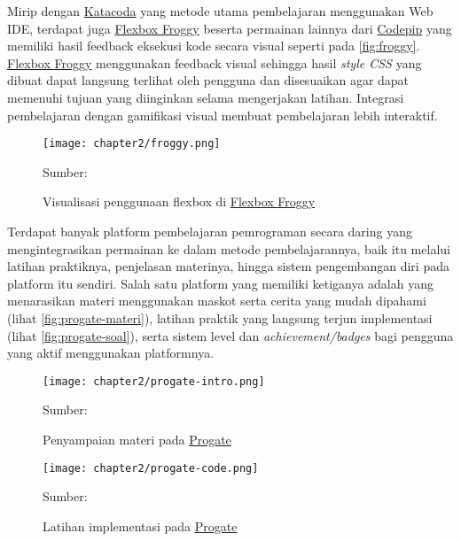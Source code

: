 Mirip dengan \href{https://www.katacoda.com/}{Katacoda} yang metode utama pembelajaran menggunakan Web IDE, terdapat juga \href{https://flexboxfroggy.com/}{Flexbox Froggy} \parencite{froggy2021media} beserta permainan lainnya dari \href{https://codepip.com/games/}{Codepip} yang memiliki hasil feedback eksekusi kode secara visual seperti pada \autoref{fig:froggy}. \href{https://flexboxfroggy.com/}{Flexbox Froggy} menggunakan feedback visual sehingga hasil \textit{style CSS} yang dibuat dapat langsung terlihat oleh pengguna dan disesuaikan agar dapat memenuhi tujuan yang diinginkan selama mengerjakan latihan. Integrasi pembelajaran dengan gamifikasi visual membuat pembelajaran lebih interaktif.

\begin{figure}[!h]
  \centering
  \texttt{[image: chapter2/froggy.png]}
  \caption{Visualisasi penggunaan flexbox di \href{https://www.flexboxfroggy.com/}{Flexbox Froggy}} \label{fig:froggy}
  Sumber: \textcite{froggy2021media}
\end{figure}

Terdapat banyak platform pembelajaran pemrograman secara daring yang mengintegrasikan permainan ke dalam metode pembelajarannya, baik itu melalui latihan praktiknya, penjelasan materinya, hingga sistem pengembangan diri pada platform itu sendiri. Salah satu platform yang memiliki ketiganya adalah \textcite{progate2021media} yang menarasikan materi menggunakan maskot serta cerita yang mudah dipahami (lihat \autoref{fig:progate-materi}), latihan praktik yang langsung terjun implementasi (lihat \autoref{fig:progate-soal}), serta sistem level dan \textit{achievement/badges} bagi pengguna yang aktif menggunakan platformnya.

\begin{figure}[!h]
  \centering
  \texttt{[image: chapter2/progate-intro.png]}
  \caption{Penyampaian materi pada \href{https://www.progate.com/}{Progate}} \label{fig:progate-materi}
  Sumber: \textcite{progate2021media}
\end{figure}

\begin{figure}[!h]
  \centering
  \texttt{[image: chapter2/progate-code.png]}
  \caption{Latihan implementasi pada \href{https://www.progate.com/}{Progate}}\label{fig:progate-soal}
  Sumber: \textcite{progate2021media}
\end{figure}

